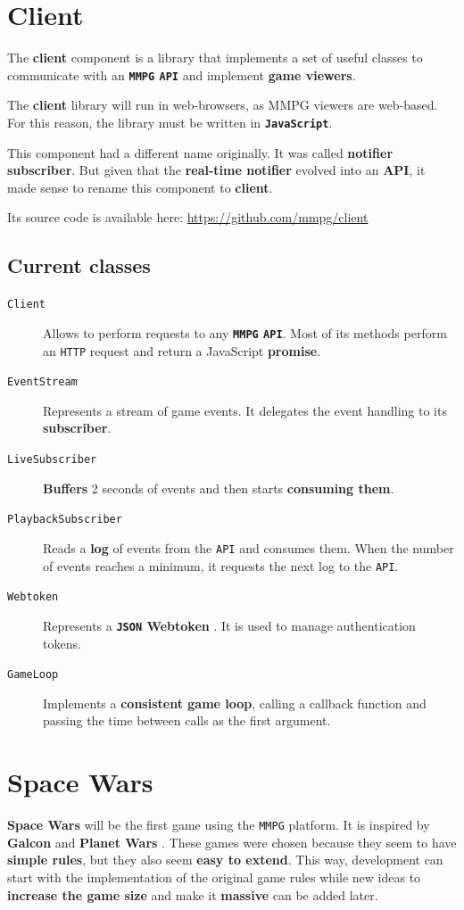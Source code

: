 \documentclass[a4paper,11pt,titlepage,abstract,numbers=noenddot,automark,mnsy,intlimits,rgb,dvipsnames]{report}
\begin{document}
\chapter{Client}
The \textbf{client} component is a library that implements a set of useful classes to communicate with
an \textbf{\texttt{MMPG} \texttt{API}} and implement \textbf{game viewers}.

The \textbf{client} library will run in web-browsers, as \texttt{}MMPG\texttt{} viewers are web-based. For this reason, the library
must be written in \textbf{\texttt{JavaScript}}.

This component had a different name originally. It was called \textbf{notifier subscriber}. But given that the \textbf{real-time
notifier} evolved into an \textbf{API}, it made sense to rename this component to \textbf{client}.

Its source code is available here: \url{https://github.com/mmpg/client}
\section{Current classes}
\begin{description}
\item[\texttt{Client}]
Allows to perform requests to any \textbf{\texttt{MMPG} \texttt{API}}. Most of its methods perform an \texttt{HTTP} request
  and return a JavaScript \textbf{promise}.
\item[\texttt{EventStream}]
Represents a stream of game events. It delegates the event handling to its \textbf{subscriber}.
\item[\texttt{LiveSubscriber}]
\textbf{Buffers} 2 seconds of events and then starts \textbf{consuming them}.
\item[\texttt{PlaybackSubscriber}]
Reads a \textbf{log} of events from the \texttt{API} and consumes them. When the number of
  events reaches a minimum, it requests the next log to the \texttt{API}.
\item[\texttt{Webtoken}]
Represents a \textbf{\texttt{JSON} Webtoken} \cite{jwt}. It is used to manage authentication tokens.
\item[\texttt{GameLoop}]
Implements a \textbf{consistent game loop}, calling a callback function and passing the time
  between calls as the first argument.
\end{description}
\clearpage
\chapter{Space Wars}
\textbf{Space Wars} will be the first game using the \texttt{MMPG} platform. It is inspired by \textbf{Galcon} \cite{galcon}
and \textbf{Planet Wars} \cite{planet_wars}. These games were chosen because they seem to have \textbf{simple rules}, but they
also seem \textbf{easy to extend}. This way, development can start with the implementation of the original game rules while
new ideas to \textbf{increase the game size} and make it \textbf{massive} can be added later.
\end{document}
